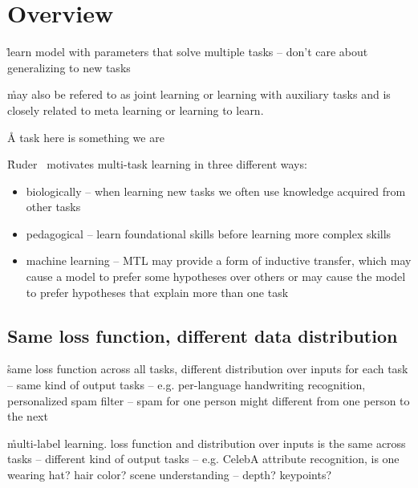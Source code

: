 \section{Overview}





\r{learn model with parameters that solve multiple tasks -- don't care about generalizing to new tasks}

\r{may also be refered to as joint learning or learning with auxiliary tasks and is closely related to meta learning  or learning to learn.}

\r{A task here is something we are }

\r{Ruder~\cite{DBLP:journals/corr/Ruder17a} motivates multi-task learning in three different ways:}

\begin{itemize}[noitemsep,topsep=0pt]
	\item biologically -- when learning new tasks we often use knowledge acquired from other tasks
	\item pedagogical -- learn foundational skills before learning more complex skills
	\item machine learning -- MTL may provide a form of inductive transfer, which may cause a model to prefer some hypotheses over others or may cause the model to prefer hypotheses that explain more than one task
\end{itemize}


\subsection{Same loss function, different data distribution}

\r{same loss function across all tasks, different distribution over inputs for each task -- same kind of output tasks -- e.g. per-language handwriting recognition, personalized spam filter -- spam for one person might different from one person to the next}

\r{multi-label learning. loss function and distribution over inputs is the same across tasks -- different kind of output tasks -- e.g. CelebA attribute recognition, is one wearing hat? hair color? scene understanding -- depth? keypoints?}

